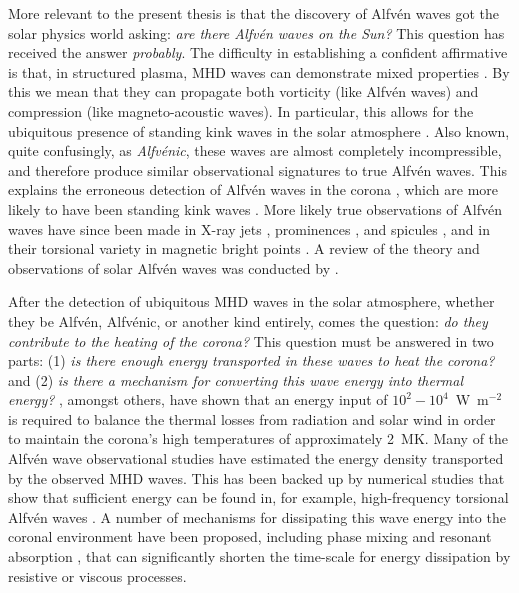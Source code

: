 \documentclass[12pt,draft]{../style-files/ociamthesis}
\begin{document}
More relevant to the present thesis is that the discovery of Alfv\'{e}n waves got the solar physics world asking: \textit{are there Alfv\'{e}n waves on the Sun?} This question has received the answer \textit{probably}. The difficulty in establishing a confident affirmative is that, in structured plasma, MHD waves can demonstrate mixed properties \citep{goo_etal09,goo_etal12,goo_etal19}. By this we mean that they can propagate both vorticity (like Alfv\'{e}n waves) and compression (like magneto-acoustic waves). In particular, this allows for the ubiquitous presence of standing kink waves in the solar atmosphere \citep{tom_etal07}. Also known, quite confusingly, as \textit{Alfv\'{e}nic}, these waves are almost completely incompressible, and therefore produce similar observational signatures to true Alfv\'{e}n waves. This explains the erroneous detection of Alfv\'{e}n waves in the corona \citep{tom_etal07}, which are more likely to have been standing kink waves \cite{van_etal08b}. More likely true observations of Alfv\'{e}n waves have since been made in X-ray jets \citep{cir_etal07}, prominences \citep{oka_etal07}, and spicules \citep{dep_etal07}, and in their torsional variety in magnetic bright points \citep{jes_etal09}. A review of the theory and observations of solar Alfv\'{e}n waves was conducted by \cite{mat_etal13}.

After the detection of ubiquitous MHD waves in the solar atmosphere, whether they be Alfv\'{e}n, Alfv\'{e}nic, or another kind entirely, comes the question: \textit{do they contribute to the heating of the corona?} This question must be answered in two parts: (1) \textit{is there enough energy transported in these waves to heat the corona?} and (2) \textit{is there a mechanism for converting this wave energy into thermal energy?} \cite{wit_etal77}, amongst others, have shown that an energy input of $10^2 - 10^4$~W~m$^{-2}$ is required to balance the thermal losses from radiation and solar wind in order to maintain the corona's high temperatures of approximately 2~MK. Many of the Alfv\'{e}n wave observational studies have estimated the energy density transported by the observed MHD waves. This has been backed up by numerical studies that show that sufficient energy can be found in, for example, high-frequency torsional Alfv\'{e}n waves \citep{sri_etal17}. A number of mechanisms for dissipating this wave energy into the coronal environment have been proposed, including phase mixing \citep{hey_etal83} and resonant absorption \citep{ion78}, that can significantly shorten the time-scale for energy dissipation by resistive or viscous processes.
\end{document}
